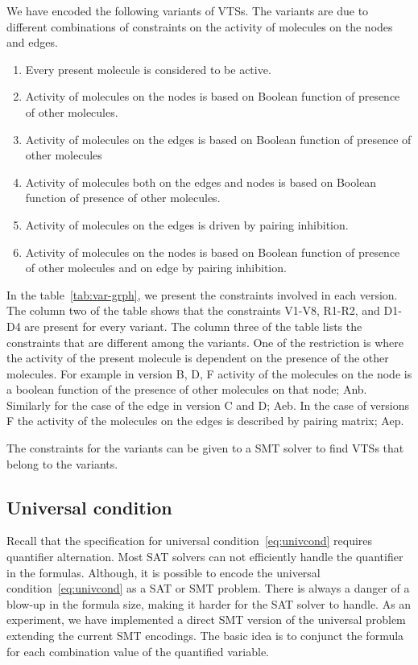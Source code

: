 We have encoded the following variants of VTSs.
%
The variants are due to different combinations of constraints on the
activity of molecules on the nodes and edges.
%
\begin{enumerate}
\item Every present molecule is considered to be active.
\item Activity of molecules on the nodes is based on Boolean function of presence of other molecules. 
\item Activity of molecules on the edges is based on Boolean function of presence of other molecules
\item Activity of molecules both on the edges and nodes is based on Boolean function of presence of other molecules.
\item Activity of molecules on the edges is driven by pairing inhibition.
\item Activity of molecules on the nodes is based on Boolean function of presence of other molecules and on edge by pairing inhibition.
\end{enumerate}
%
%


In the table~\ref{tab:var-grph}, we present the constraints involved in each version.
%
The column two of the table shows that the constraints V1-V8, R1-R2, and D1-D4 are present
for every variant.
%
The column three of the table lists the constraints that are different among the variants.
%
%
One of the restriction is where the activity of the present molecule is dependent on the presence of the other molecules.
%
For example in version B, D, F activity of the molecules on the node is a boolean function of the presence of other molecules on that node; Anb.
%
Similarly for the case of the edge in version C and D; Aeb.
%
In the case of versions F the activity of the molecules on the edges
is described by pairing matrix; Aep.

%
The constraints for the variants can be given to a SMT solver to find
VTSs that belong to the variants.

\subsection{Universal condition}
\label{enc:univ-cond}
%
Recall that the specification for universal condition~\ref{eq:univcond} requires quantifier alternation. 
%
Most SAT solvers can not efficiently handle the quantifier in the formulas. 
% 
Although, it is possible to encode the universal condition~\ref{eq:univcond} as a SAT or SMT problem.
%
There is always a danger of a blow-up in the formula size, making it harder for the SAT solver to handle. 
% 
As an experiment, we have implemented a direct SMT version of the universal problem extending the current SMT encodings.
%
The basic idea is to conjunct the formula for each combination value of the quantified variable. 
%


